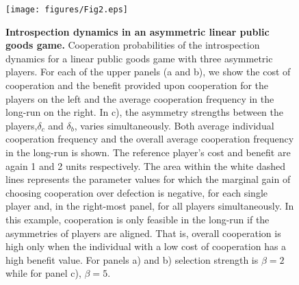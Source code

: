 \documentclass[11pt]{article}
\theoremstyle{plainCl1}
\theoremstyle{plainCl2}
\begin{document}
\clearpage
\begin{figure}
\centering
\texttt{[image: figures/Fig2.eps]}~\\[0.4cm]
\caption{\onehalfspacing
\textbf{Introspection dynamics in an asymmetric linear public goods game.} Cooperation probabilities of the introspection dynamics for a linear public goods game with three asymmetric players. For each of the upper panels (a and b), we show the cost of cooperation and the benefit provided upon cooperation for the players on the left and the average cooperation frequency in the long-run on the right. %
In c), the asymmetry strengths between the players,$\delta_c $ and $\delta_b$, varies simultaneously. Both average individual cooperation frequency and the overall average cooperation frequency in the long-run is shown. The reference player's cost and benefit are again 1 and 2 units respectively. The area within the white dashed lines represents the parameter values for which the marginal gain of choosing cooperation over defection is negative, for each single player and, in the right-most panel, for all players simultaneously. In this example, cooperation is only feasible in the long-run if the asymmetries of players are aligned. That is, overall cooperation is high only when the individual with a low cost of cooperation has a high benefit value. For panels a) and b) selection strength is $\beta = 2$ while for panel c), $\beta = 5$. 
}
\label{Fig:LPGG-asymmetric}
\end{figure}
\clearpage
\end{document}
